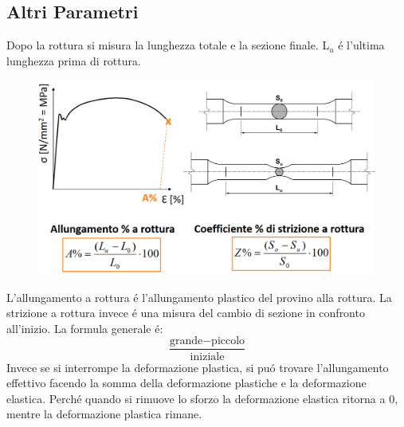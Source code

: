 \documentclass{article}
\begin{document}
{        \subsection{Altri Parametri}
            Dopo la rottura si misura la lunghezza totale e la sezione finale. L$_u$ \'e l'ultima lunghezza prima di rottura.
            \begin{figure}[!h]
                    \centering
                    \includegraphics[width=.85\linewidth]{Grafico e Equazioni di Allungamento e Strizione a Rottura.png}
            \end{figure}
            L'allungamento a rottura \'e l'allungamento plastico del provino alla rottura. La strizione a rottura invece \'e una misura del cambio di sezione in confronto all'inizio. La formula generale \'e:
            \begin{equation*}
                \frac{\text{grande}-\text{piccolo}}{\text{iniziale}}
            \end{equation*}
            Invece se si interrompe la deformazione plastica, si pu\'o trovare l'allungamento effettivo facendo la somma della deformazione plastiche e la deformazione elastica. Perch\'e quando si rimuove lo sforzo la deformazione elastica ritorna a 0, mentre la deformazione plastica rimane.
}
\end{document}
